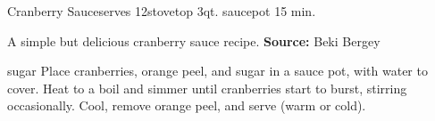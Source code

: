 \begin{recipe}{Cranberry Sauce}{serves 12}{stovetop \hfill 3qt. saucepot \hfill 15 min.}

 \freeform A simple but delicious cranberry sauce recipe.
 \textbf{Source:} Beki Bergey

  {sugar}
 Place cranberries, orange peel, and sugar in a sauce pot, with water to cover.
 \newstep Heat to a boil and simmer until cranberries start to burst, stirring occasionally.
 \newstep Cool, remove orange peel, and serve (warm or cold).

\end{recipe}
